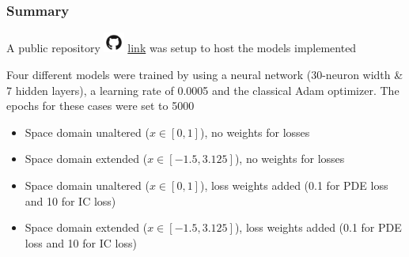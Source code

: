 \documentclass[aspectratio=169]{beamer}
\begin{document}
\begin{frame}\frametitle{Summary}
	
	A public repository \includegraphics[width=0.05\textwidth]{Figures/github_logo.png} \alert{\href{https://github.com/dalexa10/Machine_Learning/tree/main/5_Scientific_Machine_Learning/5_PINNs_Euler_Equations}{link}} was setup to host the models implemented
	
	\vspace{3mm}
	
	Four different models were trained by using a neural network (30-neuron width \& 7 hidden layers), a learning rate of 0.0005
	and the classical Adam optimizer. The epochs for these cases were set to 5000
	
	\begin{itemize}
		\item Space domain unaltered ($x \in [0, 1]$), no weights for losses
		\item Space domain extended ($x \in [-1.5, 3.125]$), no weights for losses
		\item Space domain unaltered ($x \in [0, 1]$), loss weights added (0.1 for PDE loss and 10 for IC loss)
		\item Space domain extended ($x \in [-1.5, 3.125]$), loss weights added (0.1 for PDE loss and 10 for IC loss)
	\end{itemize}
	
	
	
\end{frame}
\end{document}
